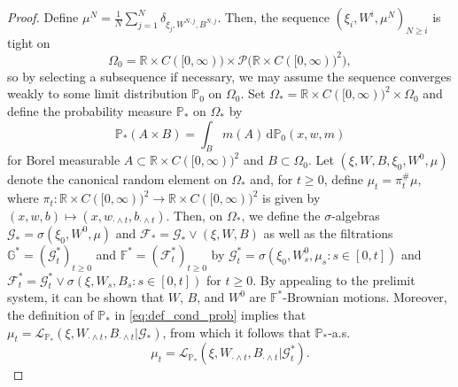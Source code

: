 \documentclass[11pt, a4paper]{article}
\theoremstyle{plain}
\theoremstyle{definition}
\theoremstyle{remark}
\numberwithin{equation}{section}
\newcommand{\pr}{\mathbb{P}}
\newcommand{\R}{\mathbb{R}}
\renewcommand{\P}{\mathcal{P}}
\newcommand{\F}{\mathcal{F}}
\renewcommand{\L}{\mathcal{L}}
\renewcommand{\d}{\mathrm{d}}
\newcommand{\define}{\mathpunct{:}}
\newcommand{\bb}[1]{\mathbb{#1}}
\renewcommand{\cal}[1]{\mathcal{#1}}
\begin{document}
\begin{proof}
Define $\mu^N = \frac{1}{N} \sum_{j = 1}^N \delta_{\xi_j, W^{N, j}, B^{N, j}}$. Then, the sequence $(\xi_i, W^i, \mu^N)_{N \geq i}$ is tight on
\begin{equation*}
    \Omega_0 = \R \times C([0, \infty)) \times \P\bigl(\R \times C([0, \infty))^2\bigr),
\end{equation*}
so by selecting a subsequence if necessary, we may assume the sequence converges weakly to some limit distribution $\bb{P}_0$ on $\Omega_0$. Set $\Omega_{\ast} = \R \times C([0, \infty))^2 \times \Omega_0$ and define the probability measure $\pr_{\ast}$ on $\Omega_{\ast}$ by 
\begin{equation} \label{eq:def_cond_prob}
    \pr_{\ast}(A \times B) = \int_B m(A) \, \d \pr_0(x, w, m)
\end{equation}
for Borel measurable $A \subset \R \times C([0, \infty))^2$ and $B \subset \Omega_0$. Let $(\xi, W, B, \xi_0, W^0, \mu)$ denote the canonical random element on $\Omega_{\ast}$ and, for $t \geq 0$, define $\mu_t = \pi^{\#}_t \mu$, where $\pi_t \define \R \times C([0, \infty))^2 \to \R \times C([0, \infty))^2$ is given by $(x, w, b) \mapsto (x, w_{\cdot \land t}, b_{\cdot \land t})$. Then, on $\Omega_{\ast}$, we define the $\sigma$-algebras $\cal{G}_{\ast} = \sigma(\xi_0, W^0, \mu)$ and $\F_{\ast} = \cal{G}_{\ast} \lor (\xi, W, B)$ as well as the filtrations $\bb{G}^{\ast} = (\cal{G}^{\ast}_t)_{t \geq 0}$ and $\bb{F}^{\ast} = (\F^{\ast}_t)_{t \geq 0}$ by $\cal{G}^{\ast}_t = \sigma(\xi_0, W^0_s, \mu_s \define s \in [0, t])$ and $\F^{\ast}_t = \cal{G}^{\ast}_t \lor \sigma(\xi, W_s, B_s \define s \in [0, t])$ for $t \geq 0$. By appealing to the prelimit system, it can be shown that $W$, $B$, and $W^0$ are $\bb{F}^{\ast}$-Brownian motions. Moreover, the definition of $\pr_{\ast}$ in \eqref{eq:def_cond_prob} implies that $\mu_t = \L_{\pr_{\ast}}(\xi, W_{\cdot \land t}, B_{\cdot \land t} \vert \cal{G}_{\ast})$, from which it follows that $\pr_{\ast}$-a.s.\@
\begin{equation} \label{eq:early_sigma_only}
    \mu_t = \L_{\pr_{\ast}}(\xi, W_{\cdot \land t}, B_{\cdot \land t} \vert \cal{G}^{\ast}_t).
\end{equation}


\end{proof}
\end{document}
